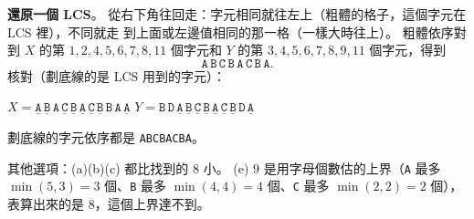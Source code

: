 \begin{pastsoln}
\textbf{還原一個 LCS}。 從右下角往回走：字元相同就往左上（粗體的格子，這個字元在 LCS 裡），不同就走
到上面或左邊值相同的那一格（一樣大時往上）。 粗體依序對到
$X$ 的第 $1, 2, 4, 5, 6, 7, 8, 11$ 個字元和 $Y$ 的第 $3, 4, 5, 6, 7, 8, 9, 11$ 個字元，得到
\[
\mathtt{A\,B\,C\,B\,A\,C\,B\,A}.
\]
核對（劃底線的是 LCS 用到的字元）：
\begin{center}
$X = \underline{\mathtt{A}}\,\underline{\mathtt{B}}\,\mathtt{A}\,\underline{\mathtt{C}}\,\underline{\mathtt{B}}\,\underline{\mathtt{A}}\,\underline{\mathtt{C}}\,\underline{\mathtt{B}}\,\mathtt{B}\,\mathtt{A}\,\underline{\mathtt{A}}$
\qquad
$Y = \mathtt{B}\,\mathtt{D}\,\underline{\mathtt{A}}\,\underline{\mathtt{B}}\,\underline{\mathtt{C}}\,\underline{\mathtt{B}}\,\underline{\mathtt{A}}\,\underline{\mathtt{C}}\,\underline{\mathtt{B}}\,\mathtt{D}\,\underline{\mathtt{A}}$
\end{center}
劃底線的字元依序都是 \texttt{ABCBACBA}。

其他選項：(a)(b)(c) 都比找到的 $8$ 小。 (e) $9$ 是用字母個數估的上界（\texttt{A} 最多 $\min(5, 3) = 3$
個、\texttt{B} 最多 $\min(4, 4) = 4$ 個、\texttt{C} 最多 $\min(2, 2) = 2$ 個），表算出來的是 $8$，這個上界達不到。
\end{pastsoln}
